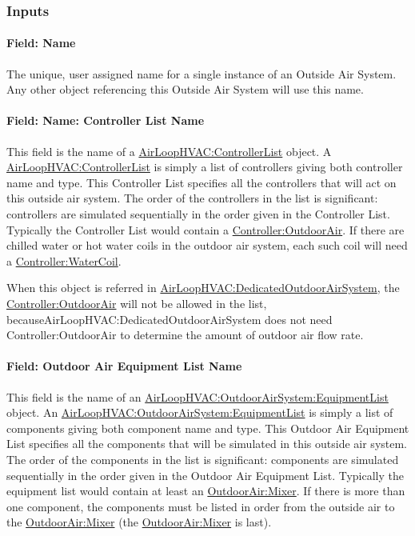 \subsubsection{Inputs}\label{inputs-3-001}

\paragraph{Field: Name}\label{field-name-3-001}

The unique, user assigned name for a single instance of an Outside Air System. Any other object referencing this Outside Air System will use this name.

\paragraph{Field: Name: Controller List Name}\label{field-name-controller-list-name}

This field is the name of a \hyperref[airloophvaccontrollerlist]{AirLoopHVAC:ControllerList} object. A \hyperref[airloophvaccontrollerlist]{AirLoopHVAC:ControllerList} is simply a list of controllers giving both controller name and type. This Controller List specifies all the controllers that will act on this outside air system. The order of the controllers in the list is significant: controllers are simulated sequentially in the order given in the Controller List. Typically the Controller List would contain a \hyperref[controlleroutdoorair]{Controller:OutdoorAir}. If there are chilled water or hot water coils in the outdoor air system, each such coil will need a \hyperref[controllerwatercoil]{Controller:WaterCoil}.

When this object is referred in \hyperref[airloophvacdedicatedoutdoorairsystem]{AirLoopHVAC:DedicatedOutdoorAirSystem}, the \hyperref[controlleroutdoorair]{Controller:OutdoorAir} will not be allowed in the list, becauseAirLoopHVAC:DedicatedOutdoorAirSystem does not need Controller:OutdoorAir to determine the amount of outdoor air flow rate.

\paragraph{Field: Outdoor Air Equipment List Name}\label{field-outdoor-air-equipment-list-name}

This field is the name of an \hyperref[airloophvacoutdoorairsystemequipmentlist]{AirLoopHVAC:OutdoorAirSystem:EquipmentList} object. An \hyperref[airloophvacoutdoorairsystemequipmentlist]{AirLoopHVAC:OutdoorAirSystem:EquipmentList} is simply a list of components giving both component name and type. This Outdoor Air Equipment List specifies all the components that will be simulated in this outside air system. The order of the components in the list is significant: components are simulated sequentially in the order given in the Outdoor Air Equipment List. Typically the equipment list would contain at least an \hyperref[outdoorairmixer]{OutdoorAir:Mixer}. If there is more than one component, the components must be listed in order from the outside air to the \hyperref[outdoorairmixer]{OutdoorAir:Mixer} (the \hyperref[outdoorairmixer]{OutdoorAir:Mixer} is last).

